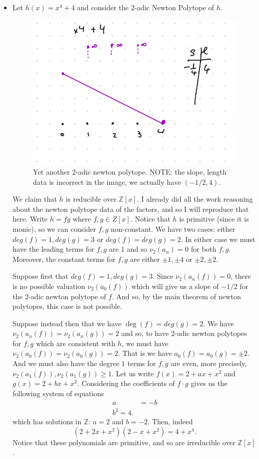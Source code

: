 \documentclass[12pt,letterpaper,boxed]{hmcpset}
\newcommand{\Z}{\mathbb Z}
\begin{document}
\begin{solution}
\begin{itemize}
\item Let $h(x) = x^4 + 4$ and consider the $2$-adic Newton Polytope
of $h$.
\begin{figure}[h]
	\centering
	\includegraphics[scale=0.5]{newt_d.png}	
	\caption{Yet another $2$-adic newton polytope.
	NOTE: the slope, length data is incorrect in the image, we
	actually have $(-1/2, 4)$.
	}
\end{figure}
We claim that $h$ is reducible over $\Z[x]$. 
I already did all the work reasoning about the newton polytope data of
the factors, and so I will reproduce that here.
Write $h = fg$ where $f,g
\in Z[x]$. Notice that $h$ is primitive (since it is monic), so we can consider $f,g$
non-constant. We have two cases: either $deg(f) = 1, deg(g) = 3$ or
$deg(f) = deg(g) = 2$. In either case we must have the leading terms
for $f,g$ are $1$ and so $\nu_2(a_n) = 0$ for both $f,g$. 
Moreover, the constant terms for $f,g$ are either $\pm 1,
\pm 4$ or $\pm 2, \pm 2$.

Suppose first that $deg(f) = 1, deg(g) = 3$. 
Since $\nu_2(a_n(f)) = 0$, there is no possible
valuation $\nu_2(a_0(f))$ which will give us a slope of $-1/2$ for the
$2$-adic newton polytope of $f$. And so, by the main theorem of newton
polytopes, this case is not possible.

Suppose instead then that we have $\deg(f) = deg(g) = 2$. We have
$\nu_2(a_n(f)) = \nu_2(a_n(g)) = 2$ and so, to have $2$-adic newton
polytopes for $f,g$ which are consistent with $h$, we must have
$\nu_2(a_0(f)) = \nu_2(a_0(g)) = 2$. That is we have $a_0(f) = a_0(g)
= \pm 2$. And we must also have the degree $1$ terms for $f,g$ are
even, more precisely, $\nu_2(a_1(f)), \nu_2(a_1(g)) \geq 1$. 
Let us write $f(x) = 2 + ax + x^2$ and $g(x) = 2 + bx + x^2$.
Considering the coefficients of $f\cdot g$ gives us the following
system of equations 
\begin{align*}
	a &= -b \\
	b^2 = 4.
\end{align*}
which has solutions in $\Z$: $a = 2$ and $b = -2$. Then, indeed \[
	(2 + 2x + x^2)(2 - x + x^2) = 4 + x^4.
\]
	Notice that these polynomials are primitive, and so are
	irreducible over $\Z[x]$.


\end{itemize}
\end{solution}
\end{document}
